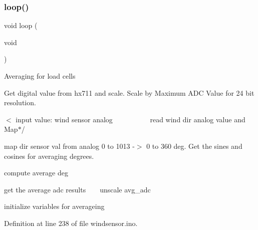 \subsubsection{\texorpdfstring{loop()}{loop()}}
{\footnotesize\ttfamily void loop (\begin{DoxyParamCaption}\item[{void}]{ }\end{DoxyParamCaption})}

Averaging for load cells

Get digital value from hx711 and scale. Scale by Maximum A\+DC Value for 24 bit resolution.

$<$ input value\+: wind sensor analog ~\newline
~\newline
~\newline
~\newline
~\newline
~\newline
 read wind dir analog value and Map$\ast$/

map dir sensor val from analog 0 to 1013 -\/$>$ 0 to 360 deg. Get the sines and cosines for averaging degrees.

compute average deg

get the average adc results ~\newline
~\newline
 unscale avg\+\_\+adc

initialize variables for averageing 

Definition at line 238 of file windsensor.\+ino.


